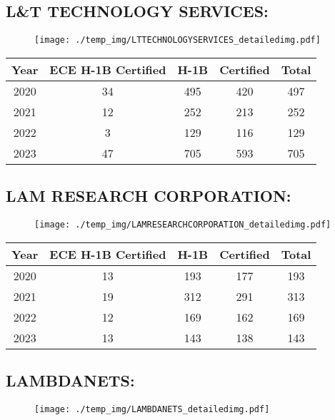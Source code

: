 \documentclass{article}%
\begin{document}
%
\newpage%
\subsection{L\&T TECHNOLOGY SERVICES:}%
\label{subsec:LTTECHNOLOGYSERVICES}%
\label{LTTECHNOLOGYSERVICESdetailed}%


\begin{figure}[htbp]%
\centering%
\texttt{[image: ./temp\_img/LTTECHNOLOGYSERVICES\_detailedimg.pdf]}%
\end{figure}

%
\begin{longtable}{c|c|c|c|c}%
\hline%
Year&ECE H{-}1B Certified&H{-}1B&Certified&Total\\%
\hline%
2020&34&495&420&497\\%
\hline%
2021&12&252&213&252\\%
\hline%
2022&3&129&116&129\\%
\hline%
2023&47&705&593&705\\%
\hline%
\end{longtable}

%
\newpage%
\subsection{LAM RESEARCH CORPORATION:}%
\label{subsec:LAMRESEARCHCORPORATION}%
\label{LAMRESEARCHCORPORATIONdetailed}%


\begin{figure}[htbp]%
\centering%
\texttt{[image: ./temp\_img/LAMRESEARCHCORPORATION\_detailedimg.pdf]}%
\end{figure}

%
\begin{longtable}{c|c|c|c|c}%
\hline%
Year&ECE H{-}1B Certified&H{-}1B&Certified&Total\\%
\hline%
2020&13&193&177&193\\%
\hline%
2021&19&312&291&313\\%
\hline%
2022&12&169&162&169\\%
\hline%
2023&13&143&138&143\\%
\hline%
\end{longtable}

%
\newpage%
\subsection{LAMBDANETS:}%
\label{subsec:LAMBDANETS}%
\label{LAMBDANETSdetailed}%


\begin{figure}[htbp]%
\centering%
\texttt{[image: ./temp\_img/LAMBDANETS\_detailedimg.pdf]}%
\end{figure}
\end{document}
